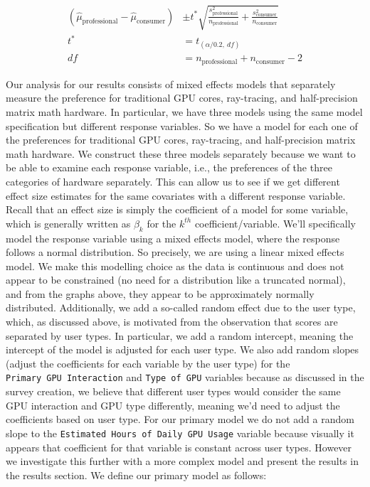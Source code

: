 \documentclass[
]{article}
\begin{document}
\[
\begin{aligned}
(\hat{\mu}_{\text{professional}} - \hat{\mu}_{\text{consumer}}) &\pm t^* \sqrt{\frac{s^2_{\text{professional}}}{n_{\text{professional}}} + \frac{s^2_{\text{consumer}}}{n_{\text{consumer}}}} \\
t^* &= t_{(\alpha/0.2, ~ df)} \\
df &= n_{\text{professional}} + n_{\text{consumer}} - 2
\end{aligned}
\]

Our analysis for our results consists of mixed effects models that
separately measure the preference for traditional GPU cores,
ray-tracing, and half-precision matrix math hardware. In particular, we
have three models using the same model specification but different
response variables. So we have a model for each one of the preferences
for traditional GPU cores, ray-tracing, and half-precision matrix math
hardware. We construct these three models separately because we want to
be able to examine each response variable, i.e., the preferences of the
three categories of hardware separately. This can allow us to see if we
get different effect size estimates for the same covariates with a
different response variable. Recall that an effect size is simply the
coefficient of a model for some variable, which is generally written as
\(\beta_{k}\) for the \(k^{th}\) coefficient/variable. We'll
specifically model the response variable using a mixed effects model,
where the response follows a normal distribution. So precisely, we are
using a linear mixed effects model. We make this modelling choice as the
data is continuous and does not appear to be constrained (no need for a
distribution like a truncated normal), and from the graphs above, they
appear to be approximately normally distributed. Additionally, we add a
so-called random effect due to the user type, which, as discussed above,
is motivated from the observation that scores are separated by user
types. In particular, we add a random intercept, meaning the intercept
of the model is adjusted for each user type. We also add random slopes
(adjust the coefficients for each variable by the user type) for the
\texttt{Primary\ GPU\ Interaction} and \texttt{Type\ of\ GPU} variables
because as discussed in the survey creation, we believe that different
user types would consider the same GPU interaction and GPU type
differently, meaning we'd need to adjust the coefficients based on user
type. For our primary model we do not add a random slope to the
\texttt{Estimated\ Hours\ of\ Daily\ GPU\ Usage} variable because
visually it appears that coefficient for that variable is constant
across user types. However we investigate this further with a more
complex model and present the results in the results section. We define
our primary model as follows:
\end{document}
